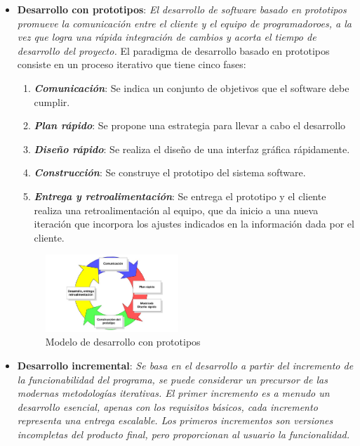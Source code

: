 \begin{itemize}
    \item \textbf{Desarrollo con prototipos}: \textit{El desarrollo de software basado en prototipos promueve la comunicación entre el cliente
    y el equipo de programadoroes, a la vez que logra una rápida integración de cambios y acorta el tiempo de desarrollo del proyecto.}
    \autocite*{RoqueHernandez2015} El paradigma de desarrollo basado en prototipos consiste en un proceso iterativo que tiene cinco 
    fases:
    \begin{enumerate}
        \item \textbf{\textit{Comunicación}}: Se indica un conjunto de objetivos que el software debe cumplir.
        \item \textbf{\textit{Plan rápido}}: Se propone una estrategia para llevar a cabo el desarrollo
        \item \textbf{\textit{Diseño rápido}}: Se realiza el diseño de una interfaz gráfica rápidamente.
        \item \textbf{\textit{Construcción}}: Se construye el prototipo del sistema software.
        \item \textbf{\textit{Entrega y retroalimentación}}: Se entrega el prototipo y el cliente realiza una 
        retroalimentación al equipo, que da inicio a una nueva iteración que incorpora los ajustes indicados en la 
        información dada por el cliente.
    \end{enumerate}\medskip
    
    \begin{figure}[H]
        \centering
        \includegraphics[width=5cm]{Figures/modelo_prototipos.jpeg}
        \caption{Modelo de desarrollo con prototipos \autocite*{ModeloPrototipos}}
    \end{figure}

    \item \textbf{Desarrollo incremental}: \textit{Se basa en el desarrollo a partir del incremento de la funcionabilidad 
    del programa, se puede considerar un precursor de las modernas metodologías iterativas. El primer incremento es 
    a menudo un desarrollo esencial, apenas con los requisitos básicos, cada incremento representa una entrega
    escalable. Los primeros incrementos son versiones incompletas del producto final, pero proporcionan al 
    usuario la funcionalidad.} \autocite*{Zumba2018} \medskip


\end{itemize}
